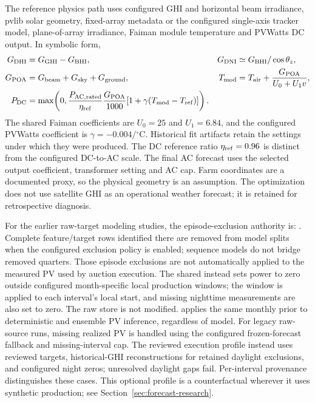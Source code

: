 \documentclass[11pt,a4paper]{article}
\begin{document}
The reference physics path uses configured GHI and horizontal beam irradiance,
pvlib solar geometry, fixed-array metadata or the configured single-axis
tracker model, plane-of-array irradiance, Faiman module temperature and PVWatts
DC output. In symbolic form,
\begin{align}
 G_{\rm DHI}&=G_{\rm GHI}-G_{\rm BHI}, &
 G_{\rm DNI}&\simeq G_{\rm BHI}/\cos\theta_z,\\
 G_{\rm POA}&=G_{\rm beam}+G_{\rm sky}+G_{\rm ground}, &
 T_{\rm mod}&=T_{\rm air}+\frac{G_{\rm POA}}{U_0+U_1v},\\
 P_{\rm DC}&=\max\!\left(0,\frac{P_{\rm AC,rated}}{\eta_{\rm ref}}
 \frac{G_{\rm POA}}{1000}[1+\gamma(T_{\rm mod}-T_{\rm ref})]\right).
\end{align}
The shared Faiman coefficients are $U_0=25$ and $U_1=6.84$, and the configured
PVWatts coefficient is $\gamma=-0.004/{}^\circ\mathrm{C}$. Historical fit
artifacts retain the settings under which they were produced. The DC reference
ratio $\eta_{\rm ref}=0.96$ is distinct from the configured
DC-to-AC scale. The final AC forecast uses the selected output coefficient,
transformer setting and AC cap. Farm coordinates are a documented proxy, so
the physical geometry is an assumption. The optimization does not use
satellite GHI as an operational weather forecast; it is retained for
retrospective diagnosis.

For the earlier raw-target modeling studies, the episode-exclusion authority is:
. Complete
feature/target rows identified there are removed from model splits when the
configured exclusion policy is enabled; sequence models do not bridge removed
quarters. Those episode exclusions are not automatically applied to the measured
PV used by auction execution. The shared  instead
sets power to zero outside configured month-specific local production windows;
the window is applied to each interval's local start, and missing nighttime
measurements are also set to zero. The raw store is not modified.
 applies the same
monthly prior to deterministic and ensemble PV inference, regardless of model.
For legacy raw-source runs, missing realized PV is handled using the configured
frozen-forecast fallback and missing-interval cap. The reviewed execution profile
instead uses reviewed targets, historical-GHI reconstructions for retained
daylight exclusions, and configured night zeros; unresolved daylight gaps fail.
Per-interval provenance distinguishes these cases. This optional profile is
a counterfactual wherever it uses synthetic production; see
Section~\ref{sec:forecast-research}.
\end{document}
